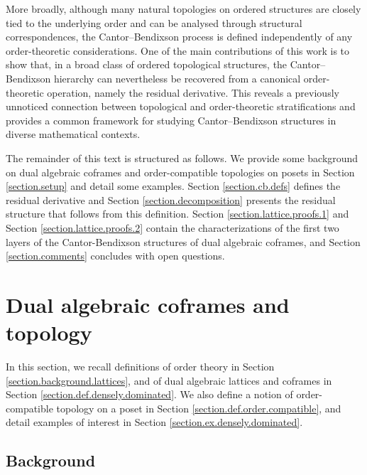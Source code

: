 \documentclass{article}
\begin{document}
More broadly, although many natural topologies on ordered structures are closely tied to the underlying order and can be analysed through structural correspondences, the Cantor--Bendixson process is defined independently of any order-theoretic considerations. One of the main contributions of this work is to show that, in a broad class of ordered topological structures, the Cantor--Bendixson hierarchy can nevertheless be recovered from a canonical order-theoretic operation, namely the residual derivative. This reveals a previously unnoticed connection between topological and order-theoretic stratifications and provides a common framework for studying Cantor--Bendixson structures in diverse mathematical contexts.


\bigskip 


The remainder of this text is structured as follows. We provide some background on {dual algebraic coframes and order-compatible topologies on posets} 
in Section \ref{section.setup} and detail some examples. Section \ref{section.cb.defs} defines the residual derivative and Section \ref{section.decomposition} presents the residual structure that follows from this definition. Section \ref{section.lattice.proofs.1} and Section \ref{section.lattice.proofs.2} contain the characterizations of the first two layers of the Cantor-Bendixson structures of dual algebraic coframes, 
and Section \ref{section.comments} concludes with open questions.

\section{\label{section.setup} Dual algebraic coframes and topology}

In this section, we recall definitions of order theory in Section \ref{section.background.lattices}, and of dual algebraic lattices and coframes in Section \ref{section.def.densely.dominated}. We also define a notion of order-compatible topology on a poset in Section \ref{section.def.order.compatible}, and detail examples of interest in Section \ref{section.ex.densely.dominated}.

\subsection{Background\label{section.background.lattices}}
\end{document}
